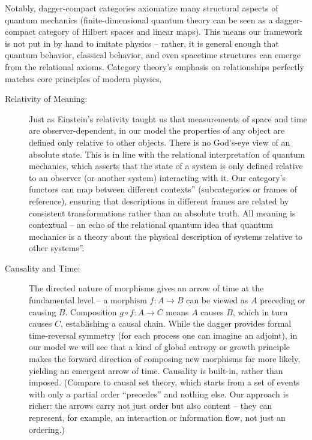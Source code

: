 \documentclass{article}
\begin{document}
Notably, dagger-compact categories axiomatize many structural aspects of quantum mechanics\cite{abramsky2009} (finite-dimensional quantum theory can be seen as a dagger-compact category of Hilbert spaces and linear maps). This means our framework is not put in by hand to imitate physics -- rather, it is general enough that quantum behavior, classical behavior, and even spacetime structures can emerge from the relational axioms. Category theory’s emphasis on relationships perfectly matches core principles of modern physics.

\begin{description}
\item[Relativity of Meaning:] Just as Einstein’s relativity taught us that measurements of space and time are observer-dependent, in our model the properties of any object are defined only relative to other objects. There is no God’s-eye view of an absolute state. This is in line with the relational interpretation of quantum mechanics, which asserts that the state of a system is only defined relative to an observer (or another system) interacting with it\cite{rovelli1996}. Our category’s functors can map between different contexts'' (subcategories or frames of reference), ensuring that descriptions in different frames are related by consistent transformations rather than an absolute truth. All meaning is contextual -- an echo of the relational quantum idea that quantum mechanics is a theory about the physical description of systems relative to other systems''\cite{rovelli1996}.

\item[Causality and Time:] The directed nature of morphisms gives an arrow of time at the fundamental level -- a morphism $f: A \to B$ can be viewed as $A$ preceding or causing $B$. Composition $g \circ f: A \to C$ means $A$ causes $B$, which in turn causes $C$, establishing a causal chain. While the dagger provides formal time-reversal symmetry (for each process one can imagine an adjoint), in our model we will see that a kind of global entropy or growth principle makes the forward direction of composing new morphisms far more likely, yielding an emergent arrow of time. Causality is built-in, rather than imposed. (Compare to causal set theory, which starts from a set of events with only a partial order ``precedes'' and nothing else\cite{bombelli1987}. Our approach is richer: the arrows carry not just order but also content -- they can represent, for example, an interaction or information flow, not just an ordering.)


\end{description}
\end{document}

